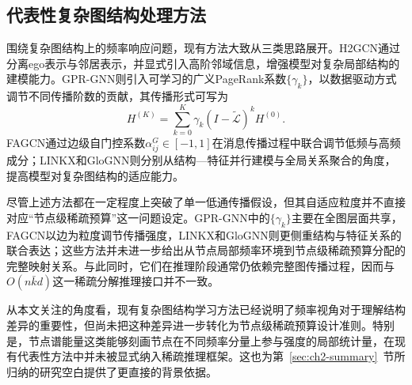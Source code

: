 \subsection{代表性复杂图结构处理方法}
\label{subsec:ch2-heteromethods}

围绕复杂图结构上的频率响应问题，现有方法大致从三类思路展开。H2GCN\cite{Zhu2020H2GCN}通过分离ego表示与邻居表示，并显式引入高阶邻域信息，增强模型对复杂局部结构的建模能力。GPR-GNN\cite{Chien2021GPRGNN}则引入可学习的广义PageRank系数$\{\gamma_k\}$，以数据驱动方式调节不同传播阶数的贡献，其传播形式可写为
\begin{equation}
  H^{(K)}=\sum_{k=0}^{K}\gamma_k(I-\tilde{\mathcal{L}})^k H^{(0)}.
  \label{eq:ch2-gprgnn}
\end{equation}
FAGCN\cite{Bo2021FAGCN}通过边级自门控系数$\alpha_{ij}^G\in[-1,1]$在消息传播过程中联合调节低频与高频成分；LINKX\cite{Lim2021LINKX}和GloGNN\cite{Li2022GloGNN}则分别从结构—特征并行建模与全局关系聚合的角度，提高模型对复杂图结构的适应能力。

尽管上述方法都在一定程度上突破了单一低通传播假设，但其自适应粒度并不直接对应“节点级稀疏预算”这一问题设定。GPR-GNN中的$\{\gamma_k\}$主要在全图层面共享，FAGCN以边为粒度调节传播强度，LINKX和GloGNN则更侧重结构与特征关系的联合表达；这些方法并未进一步给出从节点局部频率环境到节点级稀疏预算分配的完整映射关系。与此同时，它们在推理阶段通常仍依赖完整图传播过程，因而与$O(n\bar{k}d)$这一稀疏分解推理接口并不一致。

从本文关注的角度看，现有复杂图结构学习方法已经说明了频率视角对于理解结构差异的重要性，但尚未把这种差异进一步转化为节点级稀疏预算设计准则。特别是，节点谱能量这类能够刻画节点在不同频率分量上参与强度的局部统计量，在现有代表性方法中并未被显式纳入稀疏推理框架。这也为第~\ref{sec:ch2-summary}~节所归纳的研究空白提供了更直接的背景依据。



